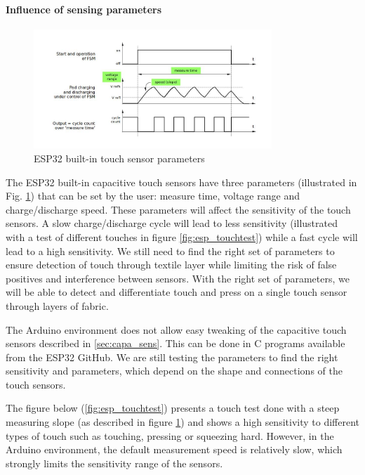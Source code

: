 \paragraph{Influence of sensing parameters}

\begin{figure}[ht]
    \centering
    \includegraphics[width=0.8\textwidth]{images/FW/touch_parameters.jpg}
    \caption{ESP32 built-in touch sensor parameters}
    \label{fig:esp_touchparameters}
\end{figure}

The ESP32 built-in capacitive touch sensors have three parameters (illustrated in Fig. \ref{fig:esp_touchparameters}) that can be set by the user: measure time, voltage range and charge/discharge speed. These parameters will affect the sensitivity of the touch sensors. A slow charge/discharge cycle will lead to less sensitivity (illustrated with a test of different touches in figure \ref{fig:esp_touchtest}) while a fast cycle will lead to a high sensitivity. We still need to find the right set of parameters to ensure detection of touch through textile layer while limiting the risk of false positives and interference between sensors. With the right set of parameters, we will be able to detect and differentiate touch and press on a single touch sensor through layers of fabric. 




The Arduino environment does not allow easy tweaking of the capacitive touch sensors described in \ref{sec:capa_sens}. This can be done in C programs available from the ESP32 GitHub. We are still testing the parameters to find the right sensitivity and parameters, which depend on the shape and connections of the touch sensors.

\medskip The figure below (\ref{fig:esp_touchtest}) presents a touch test done with a steep measuring slope (as described in figure \ref{fig:esp_touchparameters}) and shows a high sensitivity to different types of touch such as touching, pressing or squeezing hard. However, in the Arduino environment, the default measurement speed is relatively slow, which strongly limits the sensitivity range of the sensors.

